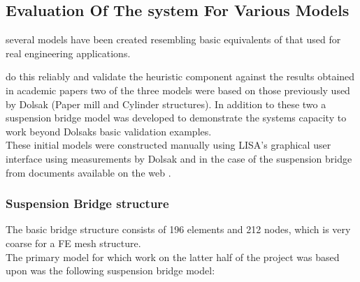 \subsection{Evaluation Of The system For Various Models}


several models have been created resembling basic equivalents of that used for real engineering applications.

 do this reliably and validate the heuristic component against the results obtained in academic papers two of the three models were based on those previously used by Dolsak (Paper mill and Cylinder structures). In addition to these two a suspension bridge model was developed to demonstrate the systems capacity to work beyond Dolsaks basic validation examples. \\ 

\noindent
These initial models were constructed manually using LISA's graphical user interface using measurements by Dolsak and in the case of the suspension bridge from documents available on the web \cite{DolsakPaper91} \cite{SuspensionBridgeMeasurements}.

\subsubsection{Suspension Bridge structure}


\noindent
The basic bridge structure consists of 196 elements and 212 nodes, which is very coarse for a FE mesh structure. \\


\noindent
The primary model for which work on the latter half of the project was based upon was the following suspension bridge model:


